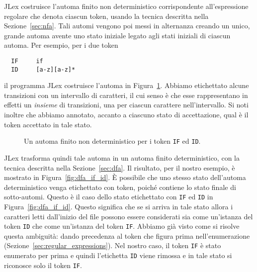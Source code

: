 JLex costruisce l'automa finito non deterministico corrispondente
all'espressione regolare che denota ciascun token, usando la tecnica
descritta nella Sezione~\ref{sec:nfa}. Tali automi vengono poi
messi in alternanza creando un unico, grande automa avente uno stato
iniziale legato agli stati iniziali di ciascun automa. Per esempio, per
i due token
%
\begin{verbatim}
  IF     if
  ID     [a-z][a-z]*
\end{verbatim}
%
il programma JLex costruisce l'automa
in Figura~\ref{fig:nfa_if_id}. Abbiamo etichettato alcune transizioni
con un intervallo di caratteri, il cui senso \`e che esse rappresentano in
effetti un \emph{insieme} di transizioni, una per ciascun carattere
nell'intervallo. Si noti inoltre che abbiamo annotato, accanto a
ciascuno stato di accettazione, qual \`e il token accettato in tale stato.
%
\begin{figure}[t]
\begin{center}
\end{center}
\caption{Un automa finito non deterministico per i token \texttt{IF} ed \texttt{ID}.}\label{fig:nfa_if_id}
\end{figure}
%
JLex trasforma quindi tale automa in un automa finito deterministico,
con la tecnica descritta nella Sezione~\ref{sec:dfa}. Il risultato, per il
nostro esempio, \`e mostrato in Figura~\ref{fig:dfa_if_id}.
\`E possibile che uno stesso stato dell'automa deterministico venga etichettato
con \piu token, poich\'e contiene lo stato finale di \piu sotto-automi.
Questo \`e il caso dello stato etichettato con \texttt{IF} ed \texttt{ID}
in Figura~\ref{fig:dfa_if_id}. Questo significa che se si arriva in tale stato
allora i caratteri letti dall'inizio del file possono essere considerati sia
come un'istanza del token \texttt{ID} che come un'istanza del token
\texttt{IF}. Abbiamo gi\`a visto come si risolve questa ambiguit\`a:
dando precedenza al token che figura prima nell'enumerazione
(Sezione~\ref{sec:regular_expressions}).
Nel nostro caso, il token \texttt{IF} \`e stato enumerato per prima e
quindi l'etichetta \texttt{ID} viene rimossa e in tale stato si riconosce
solo il token \texttt{IF}.

